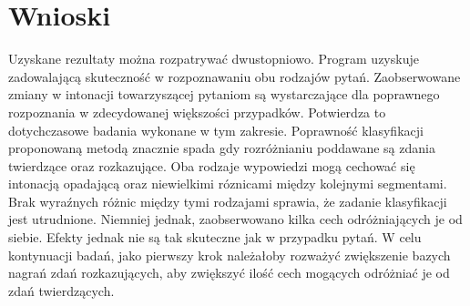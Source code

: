 \documentclass[a4paper,12 pt]{article}
\begin{document}
\section{Wnioski}
Uzyskane rezultaty można rozpatrywać dwustopniowo. Program uzyskuje zadowalającą skuteczność w rozpoznawaniu obu rodzajów pytań. Zaobserwowane zmiany w intonacji towarzyszącej pytaniom są wystarczające dla poprawnego rozpoznania w zdecydowanej większości przypadków. Potwierdza to dotychczasowe badania wykonane w tym zakresie. 
\newline
\newline Poprawność klasyfikacji proponowaną metodą znacznie spada gdy rozróżnianiu poddawane są zdania twierdzące oraz rozkazujące. Oba rodzaje wypowiedzi mogą cechować się intonacją opadającą oraz niewielkimi róznicami między kolejnymi segmentami. Brak wyraźnych różnic między tymi rodzajami sprawia, że zadanie klasyfikacji jest utrudnione. Niemniej jednak, zaobserwowano kilka cech odróżniających je od siebie. Efekty jednak nie są tak skuteczne jak w przypadku pytań.
\newline
\newline
W celu kontynuacji badań, jako pierwszy krok należałoby rozważyć zwiększenie bazych nagrań zdań rozkazujących, aby zwiększyć ilość cech mogących odróżniać je od zdań twierdzących.
\newpage
\end{document}
